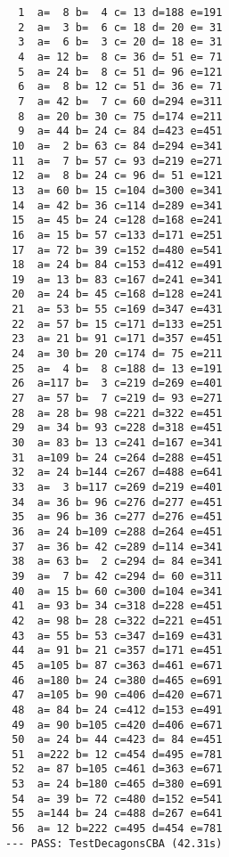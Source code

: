\documentclass[11pt]{article}
\begin{document}
\setlength{\columnsep}{50pt}
\begin{multicols}{2}
\begin{lstlisting}
  1  a=  8 b=  4 c= 13 d=188 e=191
  2  a=  3 b=  6 c= 18 d= 20 e= 31
  3  a=  6 b=  3 c= 20 d= 18 e= 31
  4  a= 12 b=  8 c= 36 d= 51 e= 71
  5  a= 24 b=  8 c= 51 d= 96 e=121
  6  a=  8 b= 12 c= 51 d= 36 e= 71
  7  a= 42 b=  7 c= 60 d=294 e=311
  8  a= 20 b= 30 c= 75 d=174 e=211
  9  a= 44 b= 24 c= 84 d=423 e=451
 10  a=  2 b= 63 c= 84 d=294 e=341
 11  a=  7 b= 57 c= 93 d=219 e=271
 12  a=  8 b= 24 c= 96 d= 51 e=121
 13  a= 60 b= 15 c=104 d=300 e=341
 14  a= 42 b= 36 c=114 d=289 e=341
 15  a= 45 b= 24 c=128 d=168 e=241
 16  a= 15 b= 57 c=133 d=171 e=251
 17  a= 72 b= 39 c=152 d=480 e=541
 18  a= 24 b= 84 c=153 d=412 e=491
 19  a= 13 b= 83 c=167 d=241 e=341
 20  a= 24 b= 45 c=168 d=128 e=241
 21  a= 53 b= 55 c=169 d=347 e=431
 22  a= 57 b= 15 c=171 d=133 e=251
 23  a= 21 b= 91 c=171 d=357 e=451
 24  a= 30 b= 20 c=174 d= 75 e=211
 25  a=  4 b=  8 c=188 d= 13 e=191
 26  a=117 b=  3 c=219 d=269 e=401
 27  a= 57 b=  7 c=219 d= 93 e=271
 28  a= 28 b= 98 c=221 d=322 e=451
 29  a= 34 b= 93 c=228 d=318 e=451
 30  a= 83 b= 13 c=241 d=167 e=341
 31  a=109 b= 24 c=264 d=288 e=451
 32  a= 24 b=144 c=267 d=488 e=641
 33  a=  3 b=117 c=269 d=219 e=401
 34  a= 36 b= 96 c=276 d=277 e=451
 35  a= 96 b= 36 c=277 d=276 e=451
 36  a= 24 b=109 c=288 d=264 e=451
 37  a= 36 b= 42 c=289 d=114 e=341
 38  a= 63 b=  2 c=294 d= 84 e=341
 39  a=  7 b= 42 c=294 d= 60 e=311
 40  a= 15 b= 60 c=300 d=104 e=341
 41  a= 93 b= 34 c=318 d=228 e=451
 42  a= 98 b= 28 c=322 d=221 e=451
 43  a= 55 b= 53 c=347 d=169 e=431
 44  a= 91 b= 21 c=357 d=171 e=451
 45  a=105 b= 87 c=363 d=461 e=671
 46  a=180 b= 24 c=380 d=465 e=691
 47  a=105 b= 90 c=406 d=420 e=671
 48  a= 84 b= 24 c=412 d=153 e=491
 49  a= 90 b=105 c=420 d=406 e=671
 50  a= 24 b= 44 c=423 d= 84 e=451
 51  a=222 b= 12 c=454 d=495 e=781
 52  a= 87 b=105 c=461 d=363 e=671
 53  a= 24 b=180 c=465 d=380 e=691
 54  a= 39 b= 72 c=480 d=152 e=541
 55  a=144 b= 24 c=488 d=267 e=641
 56  a= 12 b=222 c=495 d=454 e=781
--- PASS: TestDecagonsCBA (42.31s)
\end{lstlisting}
\end{multicols}
\end{document}
